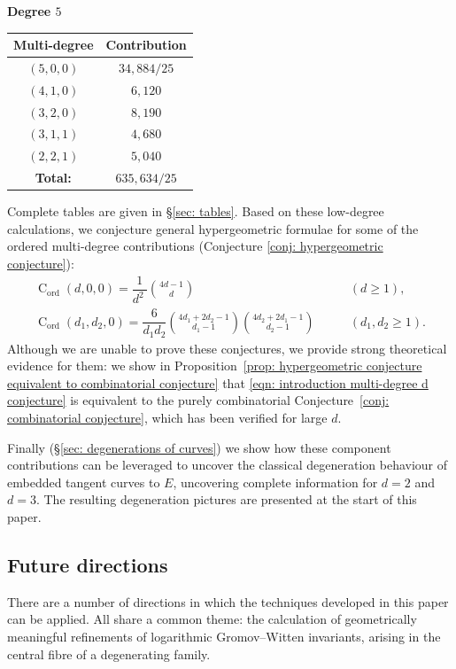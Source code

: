 \documentclass[11pt]{amsart}
\theoremstyle{definition}
\theoremstyle{definition}
\begin{document}
\begin{center}
\begin{minipage}[t]{0.4\textwidth}
\begin{center}
\noindent \textbf{Degree $5$}\\
\begin{tabular}{| c | c |}
	\hline
	\textbf{Multi-degree} & \textbf{Contribution} \\
	\hline \hline
	$(5,0,0)$ & $34,\!884/25$ \\
	\hline
	$(4,1,0)$ &  $6,\!120$ \\
	\hline 
	$(3,2,0)$ &  $8,\!190$ \\
	\hline
	$(3,1,1)$ &  $4,\!680$ \\
	\hline
	$(2,2,1)$ & $5,\!040$ \\
	\hline\hline
	\textbf{Total:} & $635,\!634/25$ \\
	\hline
\end{tabular}
\end{center}
\end{minipage}
\end{center}
\noindent  Complete tables are given in \S \ref{sec: tables}. Based on these low-degree calculations, we conjecture general hypergeometric formulae for some of the ordered multi-degree contributions (Conjecture \ref{conj: hypergeometric conjecture}):
\begin{align} \label{eqn: introduction multi-degree d conjecture} \operatorname{C}_{\operatorname{ord}}(d,0,0) = \dfrac{1}{d^2\ } {4d-1 \choose d} \qquad & (d \geq 1), \\[8pt]
\operatorname{C}_{\operatorname{ord}}(d_1,d_2,0) = \dfrac{6}{d_1 d_2} {4d_1+2d_2-1 \choose d_1 - 1} {4d_2 + 2d_1 - 1 \choose d_2 - 1} \qquad & (d_1,d_2\geq 1).
\end{align}
Although we are unable to prove these conjectures, we provide strong theoretical evidence for them: we show in Proposition~\ref{prop: hypergeometric conjecture equivalent to combinatorial conjecture} that \eqref{eqn: introduction multi-degree d conjecture} is equivalent to the purely combinatorial Conjecture~\ref{conj: combinatorial conjecture}, which has been verified for large $d$.

Finally (\S \ref{sec: degenerations of curves}) we show how these component contributions can be leveraged to uncover the classical degeneration behaviour of embedded tangent curves to $E$, uncovering complete information for $d=2$ and $d=3$. The resulting degeneration pictures are presented at the start of this paper. 

\subsection{Future directions} There are a number of directions in which the techniques developed in this paper can be applied. All share a common theme: the calculation of geometrically meaningful refinements of logarithmic Gromov--Witten invariants, arising in the central fibre of a degenerating family.
\end{document}
